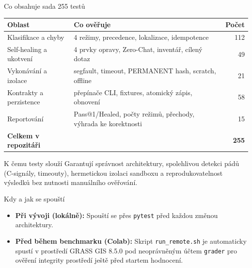 \documentclass[aspectratio=169,10pt]{beamer}
\begin{document}
\begin{frame}[t]{Co obsahuje sada 255 testů}
  \footnotesize
  \begin{table}
    \centering
    \begin{tabular}{@{}p{4.2cm}p{7.0cm}r@{}}
      \toprule
      \textbf{Oblast} & \textbf{Co ověřuje} & \textbf{Počet} \\
      \midrule
      Klasifikace a chyby
        & 4 režimy, precedence, lokalizace, idempotence & 112 \\
      Self-healing a ukotvení
        & 4 prvky opravy, Zero-Chat, inventář, cílený dotaz & 49 \\
      Vykonávání a izolace
        & segfault, timeout, PERMANENT hash, scratch, offline & 21 \\
      Kontrakty a perzistence
        & přepínače CLI, fixtures, atomický zápis, obnovení & 58 \\
      Reportování
        & Pass@1/Healed, počty režimů, přechody, výhrada ke korektnosti & 15 \\
      \midrule
      \textbf{Celkem v repozitáři} & & \textbf{255} \\
      \bottomrule
    \end{tabular}
  \end{table}

  \vspace{1mm}

  \begin{block}{K čemu testy slouží}
    Garantují správnost architektury, spolehlivou detekci pádů (C-signály, timeouty), hermetickou izolaci sandboxu a reprodukovatelnost výsledků bez nutnosti manuálního ověřování.
  \end{block}

  \begin{exampleblock}{Kdy a jak se spouští}
    \begin{itemize}
      \item \textbf{Při vývoji (lokálně):} Spouští se přes \texttt{pytest} před každou změnou architektury.
      \item \textbf{Před během benchmarku (Colab):} Skript \texttt{run\_remote.sh} je automaticky spustí v prostředí GRASS GIS 8.5.0 pod neoprávněným účtem \texttt{grader} pro ověření integrity prostředí ještě před startem hodnocení.
    \end{itemize}
  \end{exampleblock}
\end{frame}

\end{document}
